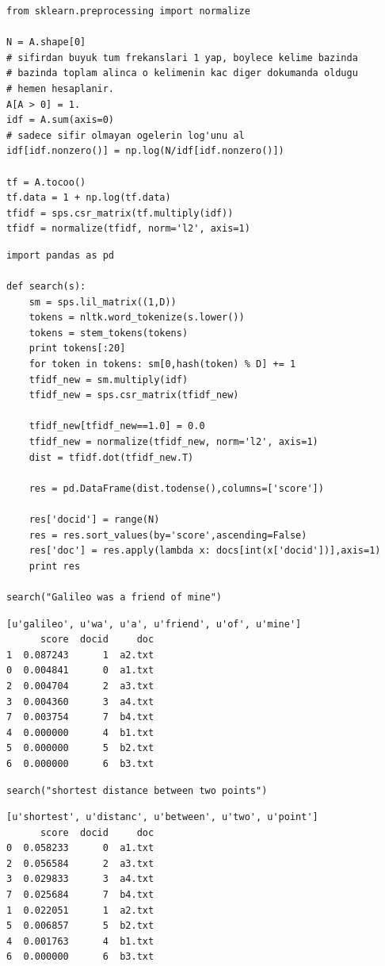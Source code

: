\documentclass[12pt,fleqn]{article}\usepackage{../../common}
\begin{document}
\begin{verbatim}
from sklearn.preprocessing import normalize

N = A.shape[0]
# sifirdan buyuk tum frekanslari 1 yap, boylece kelime bazinda
# bazinda toplam alinca o kelimenin kac diger dokumanda oldugu
# hemen hesaplanir.
A[A > 0] = 1.
idf = A.sum(axis=0)
# sadece sifir olmayan ogelerin log'unu al
idf[idf.nonzero()] = np.log(N/idf[idf.nonzero()])

tf = A.tocoo()
tf.data = 1 + np.log(tf.data)
tfidf = sps.csr_matrix(tf.multiply(idf))
tfidf = normalize(tfidf, norm='l2', axis=1)
\end{verbatim}

\begin{verbatim}
import pandas as pd

def search(s):
    sm = sps.lil_matrix((1,D))
    tokens = nltk.word_tokenize(s.lower())
    tokens = stem_tokens(tokens)    
    print tokens[:20]
    for token in tokens: sm[0,hash(token) % D] += 1
    tfidf_new = sm.multiply(idf)
    tfidf_new = sps.csr_matrix(tfidf_new)

    tfidf_new[tfidf_new==1.0] = 0.0        
    tfidf_new = normalize(tfidf_new, norm='l2', axis=1)
    dist = tfidf.dot(tfidf_new.T)

    res = pd.DataFrame(dist.todense(),columns=['score'])

    res['docid'] = range(N)
    res = res.sort_values(by='score',ascending=False)
    res['doc'] = res.apply(lambda x: docs[int(x['docid'])],axis=1)
    print res

search("Galileo was a friend of mine")    
\end{verbatim}

\begin{verbatim}
[u'galileo', u'wa', u'a', u'friend', u'of', u'mine']
      score  docid     doc
1  0.087243      1  a2.txt
0  0.004841      0  a1.txt
2  0.004704      2  a3.txt
3  0.004360      3  a4.txt
7  0.003754      7  b4.txt
4  0.000000      4  b1.txt
5  0.000000      5  b2.txt
6  0.000000      6  b3.txt
\end{verbatim}

\begin{verbatim}
search("shortest distance between two points")
\end{verbatim}

\begin{verbatim}
[u'shortest', u'distanc', u'between', u'two', u'point']
      score  docid     doc
0  0.058233      0  a1.txt
2  0.056584      2  a3.txt
3  0.029833      3  a4.txt
7  0.025684      7  b4.txt
1  0.022051      1  a2.txt
5  0.006857      5  b2.txt
4  0.001763      4  b1.txt
6  0.000000      6  b3.txt
\end{verbatim}
\end{document}
